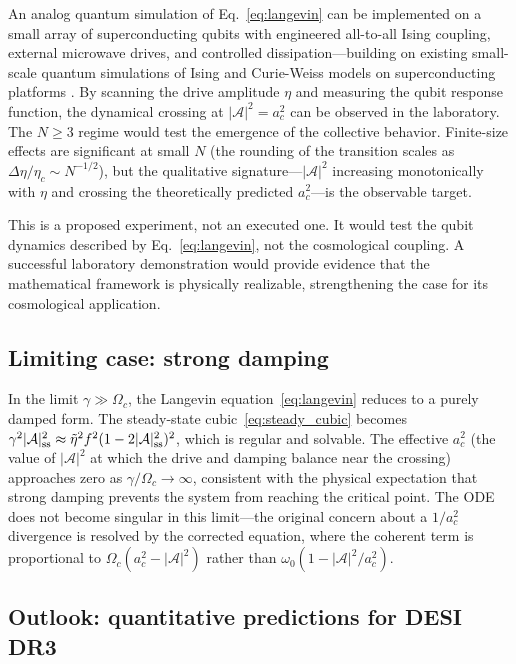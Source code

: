 \documentclass[aps,prd,twocolumn,superscriptaddress]{revtex4-2}
\begin{document}
An analog quantum simulation of Eq.~\eqref{eq:langevin} can be implemented on a small array of superconducting qubits with engineered all-to-all Ising coupling, external microwave drives, and controlled dissipation---building on existing small-scale quantum simulations of Ising and Curie-Weiss models on superconducting platforms \cite{Salathe:2015,Barends:2016}. By scanning the drive amplitude $\eta$ and measuring the qubit response function, the dynamical crossing at $|\mathcal{A}|^2 = a_c^2$ can be observed in the laboratory. The $N \ge 3$ regime would test the emergence of the collective behavior. Finite-size effects are significant at small $N$ (the rounding of the transition scales as $\Delta \eta/\eta_c \sim N^{-1/2}$), but the qualitative signature---$|\mathcal{A}|^2$ increasing monotonically with $\eta$ and crossing the theoretically predicted $a_c^2$---is the observable target.

This is a proposed experiment, not an executed one. It would test the qubit dynamics described by Eq.~\eqref{eq:langevin}, not the cosmological coupling. A successful laboratory demonstration would provide evidence that the mathematical framework is physically realizable, strengthening the case for its cosmological application.

\subsection{Limiting case: strong damping}

In the limit $\gamma \gg \Omega_c$, the Langevin equation~\eqref{eq:langevin} reduces to a purely damped form. The steady-state cubic~\eqref{eq:steady_cubic} becomes $\gamma^2 |\mathcal{A}|^2_{\rm ss} \approx \tilde{\eta}^2 f^2 (1-2|\mathcal{A}|^2_{\rm ss})^2$, which is regular and solvable. The effective $a_c^2$ (the value of $|\mathcal{A}|^2$ at which the drive and damping balance near the crossing) approaches zero as $\gamma/\Omega_c \to \infty$, consistent with the physical expectation that strong damping prevents the system from reaching the critical point. The ODE does not become singular in this limit---the original concern about a $1/a_c^2$ divergence is resolved by the corrected equation, where the coherent term is proportional to $\Omega_c(a_c^2 - |\mathcal{A}|^2)$ rather than $\omega_0(1 - |\mathcal{A}|^2/a_c^2)$.

\subsection{Outlook: quantitative predictions for DESI DR3}
\end{document}

